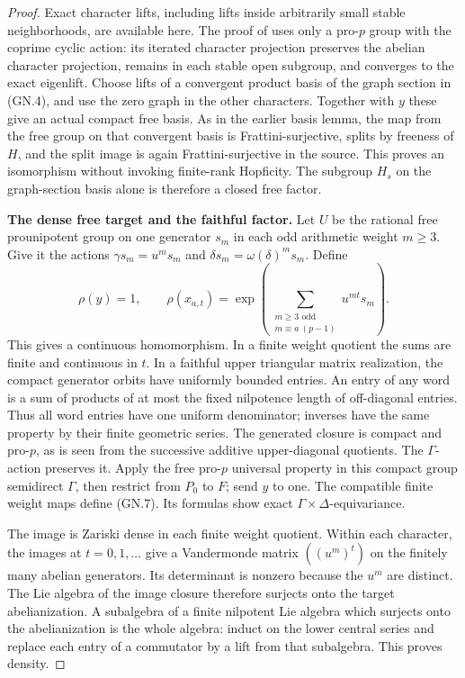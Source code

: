 \begin{proof}
Exact character lifts, including lifts inside arbitrarily small
stable neighborhoods, are available here. The proof of
\cite[Lemma~2.1, pp.~3--4]{Sharifi2002} uses only a pro-\(p\)
group with the coprime cyclic action: its iterated character
projection preserves the abelian character projection, remains in
each stable open subgroup, and converges to the exact eigenlift.
Choose lifts of a convergent product basis of the graph section
in (GN.4), and use the zero graph in the other characters.
Together with \(y\) these give an actual compact free basis.
As in the earlier basis lemma, the map from the free group on
that convergent basis is Frattini-surjective, splits by freeness
of \(H\), and the split image is again Frattini-surjective in
the source. This proves an isomorphism without invoking
finite-rank Hopficity. The subgroup \(H_s\) on the graph-section
basis alone is therefore a closed free factor.

\par\medskip\noindent\textbf{The dense free target and the faithful factor.}
Let \(U\) be the rational free prounipotent group on one generator
\(s_m\) in each odd arithmetic weight \(m\ge3\). Give it the
actions \(\gamma s_m=u^m s_m\) and
\(\delta s_m=\omega(\delta)^m s_m\). Define
\[
 \rho(y)=1,\qquad
 \rho(x_{a,t})=
  \exp\left(\sum_{\substack{m\ge3\text{ odd}\\m\equiv a\ (p-1)}}
                 u^{mt}s_m\right).
 \tag{GN.7}
\]
This gives a continuous homomorphism. In a finite weight quotient
the sums are finite and continuous in \(t\). In a faithful upper
triangular matrix realization, the compact generator orbits have
uniformly bounded entries. An entry of any word is a sum of
products of at most the fixed nilpotence length of off-diagonal
entries. Thus all word entries have one uniform denominator;
inverses have the same property by their finite geometric series.
The generated closure is compact and pro-\(p\), as is seen from
the successive additive upper-diagonal quotients. The
\(\Gamma\)-action preserves it. Apply the free pro-\(p\)
universal property in this compact group semidirect \(\Gamma\),
then restrict from \(P_0\) to \(F\); send \(y\) to one.
The compatible finite weight maps define (GN.7). Its formulas
show exact \(\Gamma\times\Delta\)-equivariance.

The image is Zariski dense in each finite weight quotient. Within
each character, the images at \(t=0,1,\ldots\) give a Vandermonde
matrix \(((u^m)^t)\) on the finitely many abelian generators.
Its determinant is nonzero because the \(u^m\) are distinct.
The Lie algebra of the image closure therefore surjects onto the
target abelianization. A subalgebra of a finite nilpotent Lie algebra
which surjects onto the abelianization is the whole algebra:
induct on the lower central series and replace each entry of a
commutator by a lift from that subalgebra. This proves density.


\end{proof}
